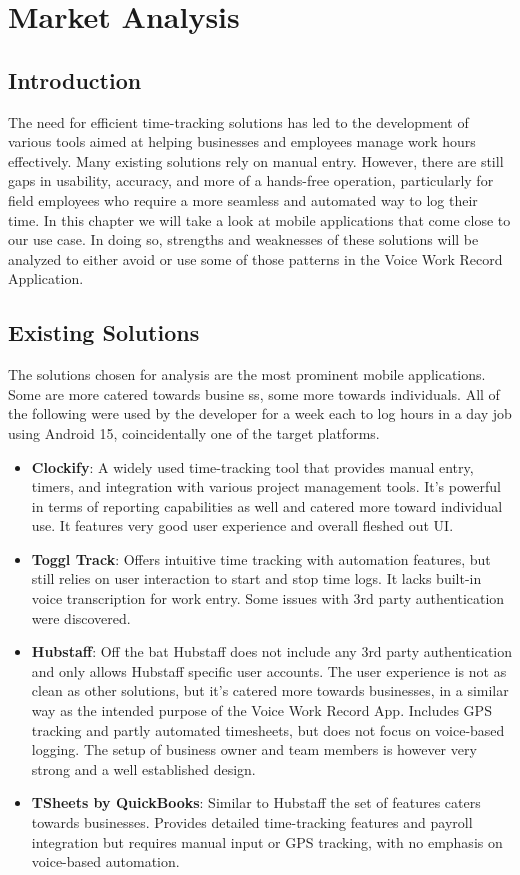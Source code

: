 \documentclass[
  digital,     %
  oneside,     %
  nosansbold,  %
  nocolorbold, %
  lof,         %
  lot,         %
]{fithesis4}
\begin{document}
\chapter{Market Analysis}

\section{Introduction}
The need for efficient time-tracking solutions has led to the development of various tools aimed at helping businesses and employees manage work hours effectively. Many existing solutions rely on manual entry. However, there are still gaps in usability, accuracy, and more of a hands-free operation, particularly for field employees who require a more seamless and automated way to log their time. In this chapter we will take a look at mobile applications that come close to our use case. In doing so, strengths and weaknesses of these solutions will be analyzed to either avoid or use some of those patterns in the Voice Work Record Application.

\section{Existing Solutions}

The solutions chosen for analysis are the most prominent mobile applications. Some are more catered towards busine   ss, some more towards individuals. All of the following were used by the developer for a week each to log hours in a day job using Android 15, coincidentally one of the target platforms.

\begin{itemize}
\item \textbf{Clockify}: A widely used time-tracking tool that provides manual entry, timers, and integration with various project management tools. It's powerful in terms of reporting capabilities as well and catered more toward individual use. It features very good user experience and overall fleshed out UI.
\item \textbf{Toggl Track}: Offers intuitive time tracking with automation features, but still relies on user interaction to start and stop time logs. It lacks built-in voice transcription for work entry. Some issues with 3rd party authentication were discovered.
\item \textbf{Hubstaff}: Off the bat Hubstaff does not include any 3rd party authentication and only allows Hubstaff specific user accounts. The user experience is not as clean as other solutions, but it's catered more towards businesses, in a similar way as the intended purpose of the Voice Work Record App. Includes GPS tracking and partly automated timesheets, but does not focus on voice-based logging. The setup of business owner and team members is however very strong and a well established design.
\item \textbf{TSheets by QuickBooks}: Similar to Hubstaff the set of features caters towards businesses. Provides detailed time-tracking features and payroll integration but requires manual input or GPS tracking, with no emphasis on voice-based automation.
\end{itemize}
\end{document}
